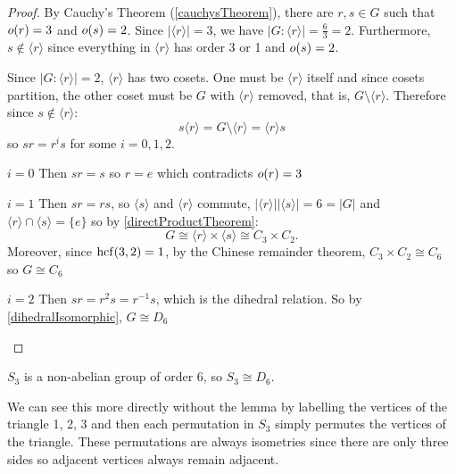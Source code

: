 \documentclass[../main.tex]{subfiles}
\begin{document}
\begin{proof}
  By Cauchy's Theorem (\cref{cauchysTheorem}), there are $r, s \in G$ such that $o(r) = 3$ and $o(s) = 2$.
  Since $|\langle r \rangle| = 3$, we have $|G : \langle r \rangle| = \frac{6}{3} = 2$.
  Furthermore, $s \notin \langle r \rangle$ since everything in $\langle r \rangle$ has order 3 or 1 and $o(s) = 2$.

  Since $|G : \langle r \rangle| = 2$, $\langle r \rangle$ has two cosets.
  One must be $\langle r \rangle$ itself and since cosets partition, the other coset must be $G$ with $\langle r \rangle$ removed, that is, $G \setminus \langle r \rangle$.
  Therefore since $s \notin \langle r \rangle$:
  \[
    s\langle r \rangle = G \setminus \langle r \rangle = \langle r \rangle s
  \]
  so $sr = r^{i}s$ for some $i = 0, 1, 2$.
  \begin{proofcases}
    \begin{case}{$i = 0$}
      Then $sr = s$ so $r = e$ which contradicts $o(r) = 3$ \cross
    \end{case}
    \begin{case}{$i = 1$}
      Then $sr = rs$, so $\langle s \rangle$ and $\langle r \rangle$ commute,
      $|\langle r \rangle| |\langle s \rangle| = 6 = |G|$ and $\langle r \rangle \cap \langle s \rangle = \{e\}$ so by \cref{directProductTheorem}:
      \[
        G \cong \langle r \rangle \times \langle s \rangle \cong C_3 \times C_2.
      \]
      Moreover, since $\operatorname{hcf}(3, 2) = 1$, by the Chinese remainder theorem, $C_3 \times C_2 \cong C_6$ so $G \cong C_6$ \tick
    \end{case}
    \begin{case}{$i = 2$}
      Then $sr = r^2s = r^{-1}s$, which is the dihedral relation.
      So by \cref{dihedralIsomorphic}, $G \cong D_6$ \tick
    \end{case}
  \end{proofcases}
\end{proof}
\begin{remark}
  $S_3$ is a non-abelian group of order 6, so $S_3 \cong D_6$.

  We can see this more directly without the lemma by labelling the vertices of the triangle 1, 2, 3 and then each permutation in $S_3$ simply permutes the vertices of the triangle.
  These permutations are always isometries since there are only three sides so adjacent vertices always remain adjacent.
\end{remark}
\end{document}
